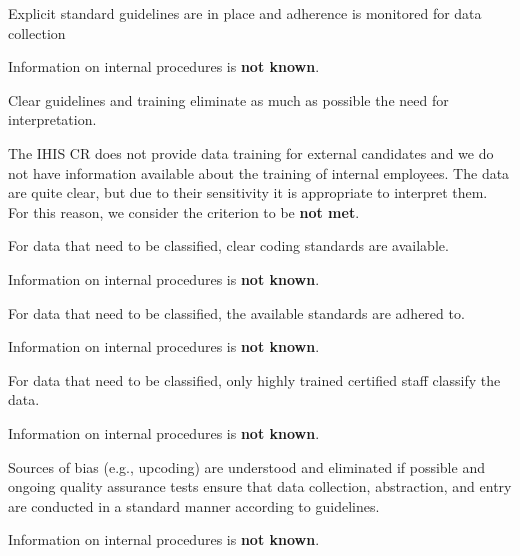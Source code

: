 \begin{QandA}
    \item Explicit standard guidelines are in place and adherence is monitored for data collection
    \begin{answered}
        Information on internal procedures is \textbf{not known}.
    \end{answered}

    \item Clear guidelines and training eliminate as much as possible the need for interpretation.
    \begin{answered}
        The IHIS CR does not provide data training for external candidates and we do not have information available about the training of internal employees.
        The data are quite clear, but due to their sensitivity it is appropriate to interpret them.
        For this reason, we consider the criterion to be \textbf{not met}.
    \end{answered}

    \item For data that need to be classified, clear coding standards are available.
    \begin{answered}
        Information on internal procedures is \textbf{not known}.
    \end{answered}

    \item For data that need to be classified, the available standards are adhered to.
    \begin{answered}
        Information on internal procedures is \textbf{not known}.
    \end{answered}

    \item For data that need to be classified, only highly trained certified staff classify the data.
    \begin{answered}
        Information on internal procedures is \textbf{not known}.
    \end{answered}

    \item Sources of bias (e.g., upcoding) are understood and eliminated if possible and ongoing quality assurance tests ensure that data collection, abstraction, and entry are conducted in a standard manner according to guidelines.
    \begin{answered}
        Information on internal procedures is \textbf{not known}.
    \end{answered}

\end{QandA}

